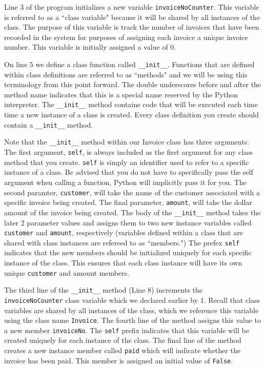 \documentclass{book}
\begin{document}
Line 3 of the program initializes a new variable \texttt{invoiceNoCounter}. This variable is referred to as a ``class variable" because it will be shared by all instances of the class. The purpose of this variable is track the number of invoices that have been recorded in the system for purposes of assigning each invoice a unique invoice number. This variable is initially assigned a value of 0.

On line 5 we define a class function called \texttt{\_\_init\_\_}. Functions that are defined within class definitions are referred to as ``methods" and we will be using this terminology from this point forward. The double underscores before and after the method name indicates that this is a special name reserved by the Python interpreter. The \texttt{\_\_init\_\_} method contains code that will be executed each time time a new instance of a class is created. Every class definition you create should contain a \texttt{\_\_init\_\_} method. 

Note that the \texttt{\_\_init\_\_} method within our Invoice class has three arguments. The first argument, \texttt{self}, is always included as the first argument for any class method that you create. \texttt{self} is simply an identifier used to refer to a specific instance of a class. Be advised that you do not have to specifically pass the self argument when calling a function, Python will implicitly pass it for you. The second paramter, \texttt{customer}, will take the name of the customer associated with a specific invoice being created. The final parameter, \texttt{amount}, will take the dollar amount of the invoice being created. The body of the \texttt{\_\_init\_\_} method takes the later 2 parameter values and assigns them to two new instance variables called \texttt{customer} and \texttt{amount}, respectively (variables defined within a class that are shared with class instances are refereed to as ``members.") The prefex \texttt{self} indicates that the new members should be initialized uniquely for each specific instance of the class. This ensures that each class instance will have its own unique \texttt{customer} and {amount} members.

The third line of the \texttt{\_\_init\_\_} method (Line 8) increments the \texttt{invoiceNoCounter} class variable which we declared earlier by 1. Recall that class variables are shared by all instances of the class, which we reference this variable using the class name \texttt{Invoice}. The fourth line of the method assigns this value to a new member \texttt{invoiceNo}. The \texttt{self} prefix indicates that this variable will be created uniquely for each instance of the class. The final line of the method creates a new instance member called \texttt{paid} which will indicate whether the invoice has been paid. This member is assigned an initial value of \texttt{False}.
\end{document}
